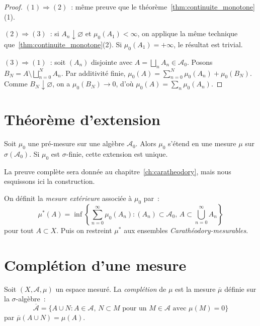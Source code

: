 \begin{proof}
$(1) \Rightarrow (2)$~: m\^eme preuve que le th\'eor\`eme~\ref{thm:continuite_monotone}(1).

$(2) \Rightarrow (3)$~: si $A_n \downarrow \varnothing$ et $\mu_0(A_1) < \infty$,
on applique la m\^eme technique que~\ref{thm:continuite_monotone}(2). Si
$\mu_0(A_1) = +\infty$, le r\'esultat est trivial.

$(3) \Rightarrow (1)$~: soit $(A_n)$ disjointe avec $A = \bigsqcup_n A_n \in
\mathcal{A}_0$. Posons $B_N = A \setminus \bigsqcup_{n=0}^{N} A_n$. Par additivit\'e
finie, $\mu_0(A) = \sum_{n=0}^{N} \mu_0(A_n) + \mu_0(B_N)$. Comme $B_N \downarrow
\varnothing$, on a $\mu_0(B_N) \to 0$, d'o\`u $\mu_0(A) = \sum_n \mu_0(A_n)$.
\end{proof}

\section{Th\'eor\`eme d'extension}

\begin{theoreme}
\label{thm:extension_preliminaire}
Soit $\mu_0$ une pr\'e-mesure sur une alg\`ebre $\mathcal{A}_0$. Alors $\mu_0$
s'\'etend en une mesure $\mu$ sur $\sigma(\mathcal{A}_0)$. Si $\mu_0$ est
$\sigma$-finie, cette extension est unique.
\end{theoreme}

La preuve compl\`ete sera donn\'ee au chapitre~\ref{ch:caratheodory}, mais nous
esquissons ici la construction.

\begin{formules}[title=\textbf{Construction de la mesure ext\'erieure}]
On d\'efinit la \emph{mesure ext\'erieure} associ\'ee \`a $\mu_0$ par~:
\[
\mu^*(A) = \inf\left\{\sum_{n=0}^{\infty} \mu_0(A_n) :
(A_n) \subset \mathcal{A}_0,\, A \subset \bigcup_{n=0}^{\infty} A_n\right\}
\]
pour tout $A \subset X$. Puis on restreint $\mu^*$ aux ensembles
\emph{Carath\'eodory-mesurables}.
\end{formules}

\section{Compl\'etion d'une mesure}

\begin{definition}
Soit $(X, \mathcal{A}, \mu)$ un espace mesur\'e. La \emph{compl\'etion} de $\mu$
est la mesure $\overline{\mu}$ d\'efinie sur la $\sigma$-alg\`ebre~:
\[
\overline{\mathcal{A}} = \{A \cup N : A \in \mathcal{A},\, N \subset M \text{ pour
un } M \in \mathcal{A} \text{ avec } \mu(M) = 0\}
\]
par $\overline{\mu}(A \cup N) = \mu(A)$.
\end{definition}


